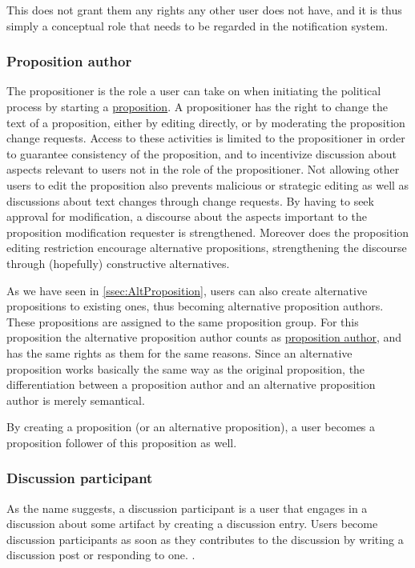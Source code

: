 This does not grant them any rights any other user does not have, and it is thus simply a conceptual role that needs to be regarded in the notification system.

\subsubsection{Proposition author}
\label{ssec:Roles_propositioner}
The propositioner is the role a user can take on when initiating the political process by starting a \hyperref[sec:Model_Propositions]{proposition}.
A propositioner has the right to change the text of a proposition, either by editing directly, or by moderating the proposition change requests.
Access to these activities is limited to the propositioner in order to guarantee consistency of the proposition, and to incentivize discussion about aspects relevant to users not in the role of the propositioner.
Not allowing other users to edit the proposition also prevents malicious or strategic editing as well as discussions about text changes through change requests.
By having to seek approval for modification, a discourse about the aspects important to the proposition modification requester is strengthened.
Moreover does the proposition editing restriction encourage alternative propositions, strengthening the discourse through (hopefully) constructive alternatives.

As we have seen in \ref{ssec:AltProposition}, users can also create alternative propositions to existing ones, thus becoming alternative proposition authors.
These propositions are assigned to the same proposition group.
For this proposition the alternative proposition author counts as \hyperref[ssec:Roles_propositioner]{proposition author}, and has the same rights as them for the same reasons.
Since an alternative proposition works basically the same way as the original proposition, the differentiation between a proposition author and an alternative proposition author is merely semantical. 

By creating a proposition (or an alternative proposition), a user becomes a proposition follower of this proposition as well.

\subsubsection{Discussion participant}
\label{ssec:Roles_DiscussionParticipant}
As the name suggests, a discussion participant is a user that engages in a discussion about some artifact by creating a discussion entry.
Users become discussion participants as soon as they contributes to the discussion by writing a discussion post or responding to one.
.

